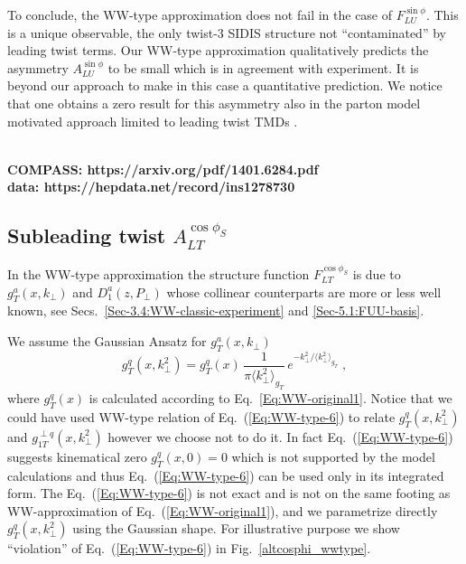 \documentclass[a4paper,11pt]{article}
\newcommand{\blue}[1]{{\color{blue} #1}}
\newcommand{\be}{\begin{equation}}
\newcommand{\ee}{\end{equation}}
\newcommand{\la}{\langle}
\newcommand{\ra}{\rangle}
\def\kperp{k_\perp}
\def\pperp{P_\perp}
\def\avkperp{\la \kperp^2 \ra}
\begin{document}
To conclude, the WW-type approximation does not fail in the case of 
$F_{LU}^{\sin\phi}$. This is a unique observable, the only twist-3 SIDIS 
structure not ``contaminated'' by leading twist terms. 
Our WW-type approximation qualitatively predicts the asymmetry 
$A_{LU}^{\sin\phi}$ to be small which is in agreement with experiment.
It is beyond our approach to make in this case a quantitative prediction. 
We notice that one obtains a zero result for this asymmetry also in
the parton model motivated approach limited to leading twist TMDs 
\cite{Anselmino:2011ch}. 

\ \\
\blue{\bf
  COMPASS: https://arxiv.org/pdf/1401.6284.pdf \\
  data: https://hepdata.net/record/ins1278730}


\newpage
\subsection{\boldmath Subleading twist  $A_{LT}^{\cos\phi_S}$}
\label{Sec-7.2:FLTcosphiS}

In the WW-type approximation the structure function
$F_{LT}^{\cos\phi_S}$ is due to $g_T^a(x,\kperp)$ and $D_1^a(z,\pperp)$ 
whose collinear counterparts are more or less well known, see
Secs.~\ref{Sec-3.4:WW-classic-experiment} and \ref{Sec-5.1:FUU-basis}.

We assume the Gaussian Ansatz for $g_T^a(x,\kperp)$ 
\be
	g^{q}_{T}(x,\kperp^2) = 
	g^{q}_{T}(x)\,\frac{1}{\pi \avkperp_{g_{T}}}\,
	e^{-\kperp^2/{\avkperp_{g_{T}}}}\;,
	\label{eq:gtnew}
\ee
where $g^{q}_{T}(x)$ is calculated according to Eq.~\ref{Eq:WW-original1}.
Notice that we could have used WW-type relation of Eq.~(\ref{Eq:WW-type-6}) to relate $g^{q}_{T}(x,\kperp^2)$
and $g^{\perp q}_{1T}(x,\kperp^2)$ however we choose not to do it. In fact Eq.~(\ref{Eq:WW-type-6}) suggests kinematical zero 
$g^{q}_{T}(x, 0) = 0$  which is not supported by the model calculations \cite{Avakian:2010br} and thus  Eq.~(\ref{Eq:WW-type-6}) can be used only in its integrated form. 
The Eq.~(\ref{Eq:WW-type-6}) is not exact and is not on the same footing as WW-approximation of Eq.~(\ref{Eq:WW-original1}), and we parametrize directly $g^{q}_{T}(x,\kperp^2)$ using the Gaussian shape. For illustrative purpose we show ``violation'' of  Eq.~(\ref{Eq:WW-type-6}) in Fig.~\ref{altcosphi_wwtype}.
\end{document}
